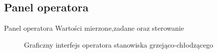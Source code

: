 \subsection{Panel operatora}
\label{lab:zad5}

Panel	operatora
Wartości	mierzone,zadane	oraz	sterowanie

\ifdefined\CompileImages
    \begin{figure}[H]      
        \caption{Graficzny interfejs operatora stanowiska grzejąco-chłodzącego}
    \end{figure}
\fi


\newpage
